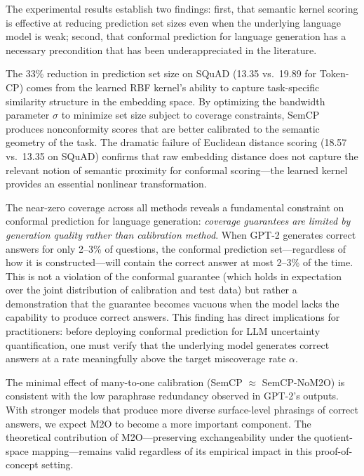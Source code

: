 \documentclass{article}
\begin{document}
\label{sec:discussion}

The experimental results establish two findings: first, that semantic kernel scoring is effective at reducing prediction set sizes even when the underlying language model is weak; second, that conformal prediction for language generation has a necessary precondition that has been underappreciated in the literature.

The 33\% reduction in prediction set size on SQuAD (13.35 vs.\ 19.89 for Token-CP) comes from the learned RBF kernel's ability to capture task-specific similarity structure in the embedding space. By optimizing the bandwidth parameter $\sigma$ to minimize set size subject to coverage constraints, SemCP produces nonconformity scores that are better calibrated to the semantic geometry of the task. The dramatic failure of Euclidean distance scoring (18.57 vs.\ 13.35 on SQuAD) confirms that raw embedding distance does not capture the relevant notion of semantic proximity for conformal scoring---the learned kernel provides an essential nonlinear transformation.

The near-zero coverage across all methods reveals a fundamental constraint on conformal prediction for language generation: \emph{coverage guarantees are limited by generation quality rather than calibration method}. When GPT-2 generates correct answers for only 2--3\% of questions, the conformal prediction set---regardless of how it is constructed---will contain the correct answer at most 2--3\% of the time. This is not a violation of the conformal guarantee (which holds in expectation over the joint distribution of calibration and test data) but rather a demonstration that the guarantee becomes vacuous when the model lacks the capability to produce correct answers. This finding has direct implications for practitioners: before deploying conformal prediction for LLM uncertainty quantification, one must verify that the underlying model generates correct answers at a rate meaningfully above the target miscoverage rate $\alpha$.

The minimal effect of many-to-one calibration (SemCP $\approx$ SemCP-NoM2O) is consistent with the low paraphrase redundancy observed in GPT-2's outputs. With stronger models that produce more diverse surface-level phrasings of correct answers, we expect M2O to become a more important component. The theoretical contribution of M2O---preserving exchangeability under the quotient-space mapping---remains valid regardless of its empirical impact in this proof-of-concept setting.
\end{document}
